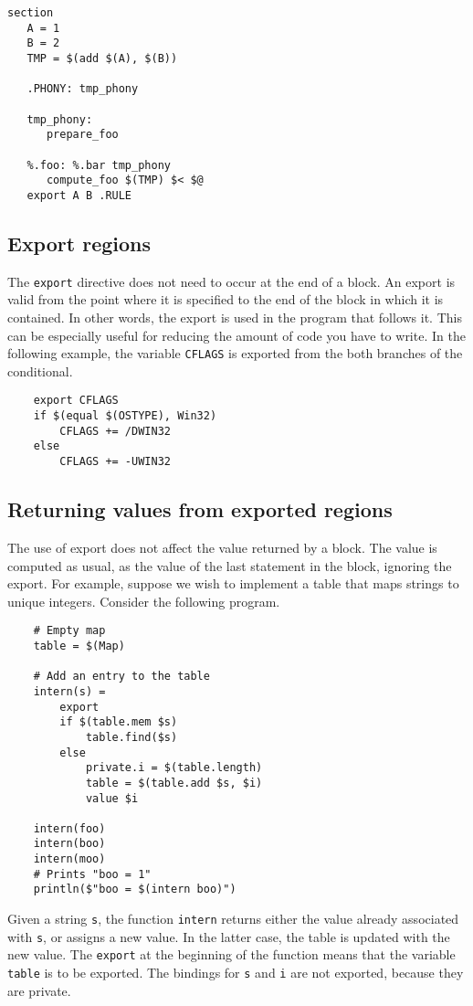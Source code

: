 \begin{verbatim}
section
   A = 1
   B = 2
   TMP = $(add $(A), $(B))

   .PHONY: tmp_phony

   tmp_phony:
      prepare_foo

   %.foo: %.bar tmp_phony
      compute_foo $(TMP) $< $@
   export A B .RULE
\end{verbatim}

\subsection{Export regions}

\newinreorg

The \verb+export+ directive does not need to occur at the end of a block.  An export is valid from
the point where it is specified to the end of the block in which it is contained.  In other words,
the export is used in the program that follows it.  This can be especially useful for reducing the
amount of code you have to write.  In the following example, the variable \verb+CFLAGS+ is exported
from the both branches of the conditional.

\begin{verbatim}
    export CFLAGS
    if $(equal $(OSTYPE), Win32)
        CFLAGS += /DWIN32
    else
        CFLAGS += -UWIN32
\end{verbatim}

\subsection{Returning values from exported regions}

\newinreorg

The use of export does not affect the value returned by a block.  The value is computed as usual, as
the value of the last statement in the block, ignoring the export.  For example, suppose we wish to
implement a table that maps strings to unique integers.  Consider the following program.

\begin{verbatim}
    # Empty map
    table = $(Map)

    # Add an entry to the table
    intern(s) =
        export
        if $(table.mem $s)
            table.find($s)
        else
            private.i = $(table.length)
            table = $(table.add $s, $i)
            value $i

    intern(foo)
    intern(boo)
    intern(moo)
    # Prints "boo = 1"
    println($"boo = $(intern boo)")
\end{verbatim}
%
Given a string \verb+s+, the function \verb+intern+ returns either the value already associated with
\verb+s+, or assigns a new value.  In the latter case, the table is updated with the new value.  The
\verb+export+ at the beginning of the function means that the variable \verb+table+ is to be
exported.  The bindings for \verb+s+ and \verb+i+ are not exported, because they are private.

